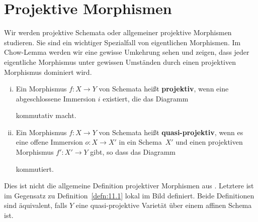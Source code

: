 
\chapter{Projektive Morphismen}

Wir werden projektive Schemata oder allgemeiner projektive Morphismen studieren. Sie sind ein wichtiger Spezialfall von eigentlichen Morphismen. Im Chow-Lemma %
werden wir eine gewisse Umkehrung sehen und zeigen, dass jeder eigentliche Morphismus unter gewissen Umständen durch einen projektiven Morphismus dominiert wird.

\begin{defn}
	\label{defn:11.1}
	\begin{enumerate}[i)]
	\item Ein Morphismus $f \colon X \to Y$ von Schemata heißt \textbf{projektiv}, wenn eine abgeschlossene Immersion $i$ existiert, die das Diagramm
		\begin{center}
			\hspace*{1.2cm}
		\end{center}
		kommutativ macht.
	\item Ein Morphismus $f \colon X \to Y$ von Schemata heißt \textbf{quasi-projektiv}, wenn es eine offene Immersion $o \colon X \to X'$ in ein Schema~$X'$ und einen projektiven Morphismus $f' \colon X' \to Y$ gibt, so dass das Diagramm
		\begin{center}
		\end{center}
		kommutiert.
	\end{enumerate}
\end{defn}

\begin{warn}
	\label{warn:11.2}
	Dies ist nicht die allgemeine Definition projektiver Morphismen aus \cite[{}5.5]{grothendieck1961elements}. Letztere ist im Gegensatz zu Definition~\ref{defn:11.1} lokal im Bild definiert.
	Beide Definitionen sind äquivalent, falls $Y$ eine quasi-projektive Varietät über einem affinen Schema ist.
\end{warn}


